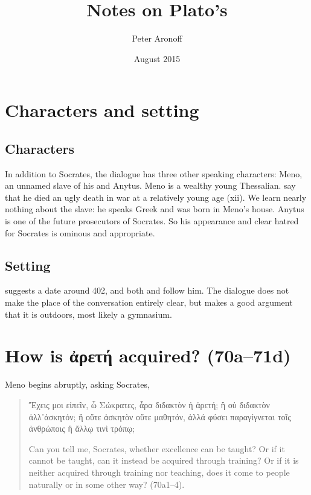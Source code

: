 \documentclass[11pt]{article}
\begin{document}
\begin{titlepage}
\title{Notes on Plato's }
\author{Peter Aronoff}
\date{August 2015}
\maketitle
\thispagestyle{empty}
\end{titlepage}

\section{Characters and setting}

\subsection{Characters}

In addition to Socrates, the dialogue has three other speaking characters: Meno, an unnamed slave of his and Anytus. Meno is a wealthy young Thessalian. \citet{sedleylong2010} say that he died an ugly death in war at a relatively young age (xii). We learn nearly nothing about the slave: he speaks Greek and was born in Meno's house. Anytus is one of the future prosecutors of Socrates. So his appearance and clear hatred for Socrates is ominous and appropriate.


\subsection{Setting}

\citet[76]{morrison1942} suggests a date around 402, and both \citet[120]{bluck1961} and \citet[xii]{sedleylong2010} follow him. The dialogue does not make the place of the conversation entirely clear, but \citet[120]{bluck1961} makes a good argument that it is outdoors, most likely a gymnasium.



\section{How is {\g ἀρετή} acquired? (70a--71d)}

Meno begins abruptly, asking Socrates,

\begin{quote}
   {\g Ἔχεις μοι εἰπεῖν, ὦ Σώκρατες, ἆρα διδακτὸν ἡ ἀρετή; ἢ οὐ διδακτὸν ἀλλ᾽ἀσκητόν; ἢ οὔτε ἀσκητὸν οὔτε μαθητόν, ἀλλά φύσει παραγίγνεται τοῖς ἀνθρώποις ἢ ἄλλῳ τινὶ τρόπῳ;}
    
   Can you tell me, Socrates, whether excellence can be taught? Or if it cannot be taught, can it instead be acquired through training? Or if it is neither acquired through training nor teaching, does it come to people naturally or in some other way? (70a1--4).
\end{quote}
\end{document}
